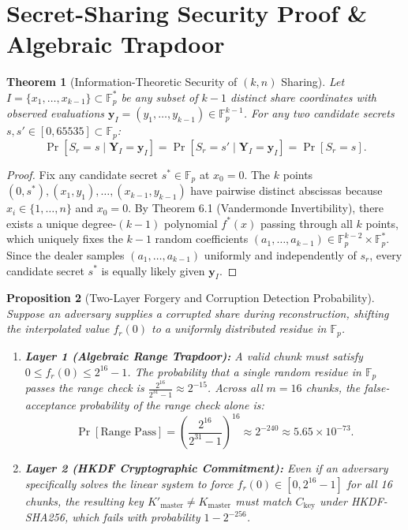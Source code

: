 \documentclass[11pt,a4paper]{article}
\newtheorem{theorem}{Theorem}[section]
\newtheorem{proposition}[theorem]{Proposition}
\theoremstyle{definition}
\newcommand{\Fp}{\mathbb{F}_p}
\newcommand{\Fps}{\mathbb{F}_p^*}
\begin{document}
\section{Secret-Sharing Security Proof \& Algebraic Trapdoor}

\begin{theorem}[Information-Theoretic Security of $(k,n)$ Sharing]
Let $I = \{x_1, \dots, x_{k-1}\} \subset \Fps$ be any subset of $k - 1$ distinct share coordinates with observed evaluations $\mathbf{y}_{I} = (y_1, \dots, y_{k-1}) \in \Fp^{k-1}$. For any two candidate secrets $s, s' \in [0, 65535] \subset \Fp$:
\[
    \Pr[S_r = s \mid \mathbf{Y}_I = \mathbf{y}_I] = \Pr[S_r = s' \mid \mathbf{Y}_I = \mathbf{y}_I] = \Pr[S_r = s].
\]
\end{theorem}
\begin{proof}
Fix any candidate secret $s^* \in \Fp$ at $x_0 = 0$. The $k$ points $(0, s^*), (x_1, y_1), \dots, (x_{k-1}, y_{k-1})$ have pairwise distinct abscissas because $x_i \in \{1, \dots, n\}$ and $x_0 = 0$. By Theorem 6.1 (Vandermonde Invertibility), there exists a unique degree-$(k-1)$ polynomial $f^*(x)$ passing through all $k$ points, which uniquely fixes the $k-1$ random coefficients $(a_1, \dots, a_{k-1}) \in \Fp^{k-2} \times \Fps$. Since the dealer samples $(a_1, \dots, a_{k-1})$ uniformly and independently of $s_r$, every candidate secret $s^*$ is equally likely given $\mathbf{y}_I$.
\end{proof}

\begin{proposition}[Two-Layer Forgery and Corruption Detection Probability]
Suppose an adversary supplies a corrupted share during reconstruction, shifting the interpolated value $f_r(0)$ to a uniformly distributed residue in $\Fp$.
\begin{enumerate}[label=(\arabic*)]
    \item \textbf{Layer 1 (Algebraic Range Trapdoor):} A valid chunk must satisfy $0 \le f_r(0) \le 2^{16}-1$. The probability that a single random residue in $\Fp$ passes the range check is $\frac{2^{16}}{2^{31}-1} \approx 2^{-15}$. Across all $m = 16$ chunks, the false-acceptance probability of the range check alone is:
    \[
        \Pr[\text{Range Pass}] = \left( \frac{2^{16}}{2^{31}-1} \right)^{16} \approx 2^{-240} \approx 5.65 \times 10^{-73}.
    \]
    \item \textbf{Layer 2 (HKDF Cryptographic Commitment):} Even if an adversary specifically solves the linear system to force $f_r(0) \in [0, 2^{16}-1]$ for all 16 chunks, the resulting key $K'_{\mathrm{master}} \neq K_{\mathrm{master}}$ must match $C_{\mathrm{key}}$ under HKDF-SHA256, which fails with probability $1 - 2^{-256}$.
\end{enumerate}
\end{proposition}
\end{document}
